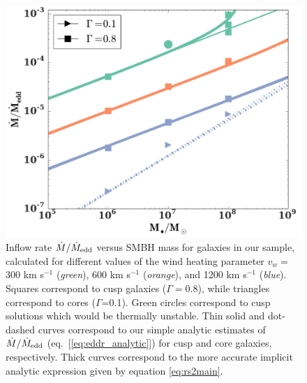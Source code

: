 \documentclass[usenatbib,fleqn]{mn2e}
\newcommand{\vwO}{v_{w}}
\begin{document}
\begin{figure}
  \includegraphics[width=\columnwidth]{mdot_mass.pdf}
  \caption{\label{fig:mdot_mass} Inflow rate $\dot{M}/\dot{M}_{\rm
      edd}$ versus SMBH mass for galaxies in our sample, calculated
    for different values of the wind heating parameter $\vwO =$ 300 km
    s$^{-1}$ ({\it green}), 600 km s$^{-1}$ ({\it orange}), and 1200
    km s$^{-1}$ ({\it blue}).  Squares correspond to cusp galaxies
    ($\Gamma=0.8$), while triangles correspond to cores
    ($\Gamma$=0.1). Green circles correspond to cusp solutions which
    would be thermally unstable.  Thin solid and dot-dashed curves
    correspond to our simple analytic estimates of $\dot{M}/\dot{M}_{\rm
      edd}$ (eq.~[\ref{eq:eddr_analytic}]) for cusp and core galaxies,
    respectively.  Thick curves correspond to the more accurate implicit analytic expression given by equation \eqref{eq:rs2main}.}
\end{figure}
\end{document}
